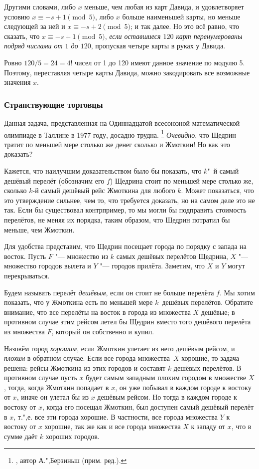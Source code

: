\documentclass[twoside]{book}
\begin{document}
Другими словами, либо $x$ меньше, чем любая из карт Давида, и
удовлетворяет условию $x\equiv-s + 1 \pmod 5$, либо $x$ больше наименьшей
карты, но меньше следующей за ней и $x\equiv -s + 2 \pmod 5$; и так
далее.  Но это всё равно, что сказать, что $x\equiv -s + 1 \pmod 5$,
\emph{если оставшиеся $120$ карт перенумерованы подряд числами от $1$ до $120$}, пропуская четыре карты в руках
у Давида.

Ровно $120/5 = 24 = 4!$ чисел от 1 до 120 имеют данное значение по модулю 5.
Поэтому, переставляя четыре карты Давида, можно закодировать все возможные значения $x$.
\heart

\subsubsection*{Странствующие торговцы} %

Данная задача, представленная на Одиннадцатой всесоюзной математической олимпиаде в Таллине в 1977 году, досадно трудна.%
\footnote{\cite[№240]{ВсМО}, автор  А.",Берзиньш (прим. ред.).}
\emph{Очевидно}, что Щедрин тратит по меньшей мере столько же денег сколько и Жмоткин!
Но как это доказать? %


Кажется, что наилучшим доказательством было бы показать, что $k$"~й самый
дешёвый перелёт (обозначим его $f$) Щедрина стоит по меньшей мере столько же, сколько $k$-й самый дешёвый рейс Жмоткина для любого $k$.
Может показаться, что это утверждение сильнее, чем то, что требуется доказать, но на самом деле это не так.
Если бы существовал контрпример, то мы могли бы подправить стоимость перелётов, не меняя их порядка, таким образом, что Щедрин потратил бы меньше, чем Жмоткин.

Для удобства представим, что Щедрин посещает города по порядку с запада на восток.
Пусть $F$ "--- множество из $k$ самых дешёвых перелётов Щедрина, $X$ "--- множество городов вылета и $Y$ "--- городов прилёта.
Заметим, что $X$ и $Y$ могут перекрываться.

Будем называть перелёт \emph{дешёвым}, если он стоит не больше перелёта $f$.
Мы хотим показать, что у Жмоткина есть по меньшей мере $k$~дешёвых перелётов.
Обратите внимание, что все перелёты на восток в города из множества $X$ дешёвые; в противном случае этим рейсом летел бы Щедрин вместо того дешёвого перелёта из множества $F$, который он собственно и купил.

Назовём город \emph{хорошим}, если Жмоткин улетает из него дешёвым рейсом, и \emph{плохим} в обратном случае.
Если все города множества~$X$ хорошие, то задача решена: рейсы Жмоткина из этих городов и составят $k$ дешёвых перелётов.
В противном случае пусть $x$ будет самым западным плохим городом в множестве $X$, тогда, когда  Жмоткин попадает в $x$, он уже побывал в каждом городе к востоку от $x$, иначе он улетал бы из $x$ дешёвым рейсом.
Но тогда в каждом городе к востоку от $x$, когда его посещал Жмоткин, был доступен самый дешёвый перелёт в $x$, т.",е. все эти города хорошие.
В частности, все города множества $Y$ к востоку от $x$ хорошие, так же как и все города множества $X$ к западу от $x$, что в сумме даёт $k$ хороших городов.
\heart
\end{document}
